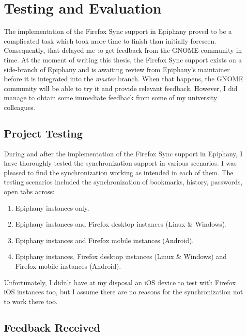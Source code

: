 \chapter{Testing and Evaluation}
\label{chapter:testing-evaluation}

The implementation of the Firefox Sync support in Epiphany proved to be a complicated task which took more time to finish than initially foreseen. Consequently, that delayed me to get feedback from the GNOME community in time. At the moment of writing this thesis, the Firefox Sync support exists on a side-branch of Epiphany and is awaiting review from Epiphany's maintainer before it is integrated into the \textit{master} branch. When that happens, the GNOME community will be able to try it and provide relevant feedback. However, I did manage to obtain some immediate feedback from some of my university colleagues.

\section {Project Testing}
\label{sec:project-testing}

During and after the implementation of the Firefox Sync support in Epiphany, I have thoroughly tested the synchronization support in various scenarios. I was pleased to find the synchronization working as intended in each of them. The testing scenarios included the synchronization of bookmarks, history, passwords, open tabs across:

\begin{enumerate}
  \item Epiphany instances only.
  \item Epiphany instances and Firefox desktop instances (Linux \& Windows).
  \item Epiphany instances and Firefox mobile instances (Android).
  \item Epiphany instances, Firefox desktop instances (Linux \& Windows) and Firefox mobile instances (Android).
\end{enumerate}

Unfortunately, I didn't have at my disposal an iOS device to test with Firefox iOS instances too, but I assume there are no reasons for the synchronization not to work there too.

\section{Feedback Received}
\label{sec:feedback-received}

